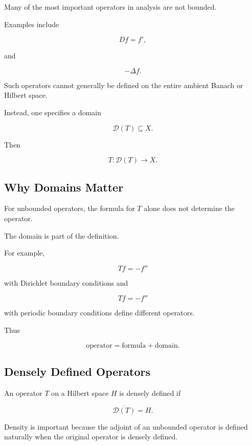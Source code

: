 Many of the most important operators in analysis are not bounded.

Examples include

\[
\boxed{
Df=f',
}
\]

and

\[
\boxed{
-\Delta f.
}
\]

Such operators cannot generally be defined on the entire ambient Banach
or Hilbert space.

Instead, one specifies a domain

\[
\boxed{
\mathcal{D}(T)\subseteq X.
}
\]

Then

\[
\boxed{
T:\mathcal{D}(T)\to X.
}
\]

\subsection{Why Domains Matter}
\label{subsec:operator-domains}

For unbounded operators, the formula for \(T\) alone does not determine
the operator.

The domain is part of the definition.

For example,

\[
Tf=-f''
\]

with Dirichlet boundary conditions and

\[
Tf=-f''
\]

with periodic boundary conditions define different operators.

Thus

\[
\boxed{
\text{operator}
=
\text{formula}
+
\text{domain}.
}
\]

\subsection{Densely Defined Operators}
\label{subsec:densely-defined-operators}

An operator \(T\) on a Hilbert space \(H\) is densely defined if

\[
\boxed{
\overline{\mathcal{D}(T)}=H.
}
\]

Density is important because the adjoint of an unbounded operator is
defined naturally when the original operator is densely defined.

